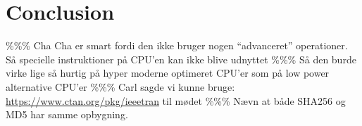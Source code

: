 \documentclass[a4paper]{article}
\begin{document}
\section{Conclusion}
\label{sec:org7db1597}




\begin{appendix}

\end{appendix}
\%\%\% Cha Cha er smart fordi den ikke bruger nogen ``advanceret'' operationer. Så specielle instruktioner på CPU'en kan ikke blive udnyttet
\%\%\% Så den burde virke lige så hurtig på hyper moderne optimeret CPU'er som på low power alternative CPU'er
\%\%\% Carl sagde vi kunne bruge: \url{https://www.ctan.org/pkg/ieeetran} til mødet
\%\%\% Nævn at både SHA256 og MD5 har samme opbygning.
\end{document}
